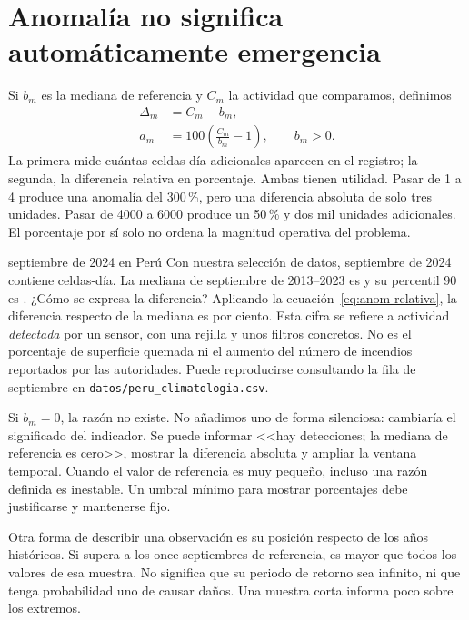 \FloatBarrier
\section{Anomalía no significa automáticamente emergencia}

Si $b_m$ es la mediana de referencia y $C_m$ la actividad que comparamos, definimos
\begin{align}
 \Delta_m &= C_m-b_m,\label{eq:anom-absoluta}\\
 a_m &=100\left(\frac{C_m}{b_m}-1\right),\qquad b_m>0.\label{eq:anom-relativa}
\end{align}
La primera mide cuántas celdas-día adicionales aparecen en el registro; la segunda, la
diferencia relativa en porcentaje. Ambas tienen utilidad. Pasar de 1 a 4 produce una
anomalía del 300\,{}\%, pero una diferencia absoluta de solo tres unidades. Pasar de 4000 a
6000 produce un 50\,{}\% y dos mil unidades adicionales. El porcentaje por sí solo no
ordena la magnitud operativa del problema.

\begin{ejemplo}{septiembre de 2024 en Perú}
Con nuestra selección de datos, septiembre de 2024 contiene \PeruSeptActual{} celdas-día.
La mediana de septiembre de 2013--2023 es \PeruSeptMediana{} y su percentil 90 es
\PeruSeptQnoventa{}. ¿Cómo se expresa la diferencia?
\solucion Aplicando la ecuación~\eqref{eq:anom-relativa}, la diferencia respecto de la
mediana es \PeruSeptAnomalia{} por ciento. Esta cifra se refiere a actividad \emph{detectada}
por un sensor, con una rejilla y unos filtros concretos. No es el porcentaje de superficie
quemada ni el aumento del número de incendios reportados por las autoridades. Puede
reproducirse consultando la fila de septiembre en \texttt{datos/peru\_climatologia.csv}.
\end{ejemplo}

Si $b_m=0$, la razón no existe. No añadimos uno de forma silenciosa: cambiaría el significado
del indicador. Se puede informar <<hay detecciones; la mediana de referencia es cero>>,
mostrar la diferencia absoluta y ampliar la ventana temporal. Cuando el valor de referencia
es muy pequeño, incluso una razón definida es inestable. Un umbral mínimo para mostrar
porcentajes debe justificarse y mantenerse fijo.

Otra forma de describir una observación es su posición respecto de los años históricos.
Si supera a los once septiembres de referencia, es mayor que todos los valores de esa
muestra. No significa que su periodo de retorno sea infinito, ni que tenga probabilidad
uno de causar daños. Una muestra corta informa poco sobre los extremos.

